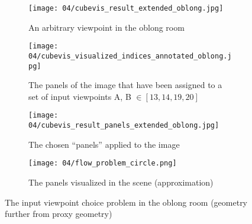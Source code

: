 \begin{figure}
\centering
    \hfill
    \begin{subfigure}[c]{0.45\textwidth}
            \centering
            \texttt{[image: 04/cubevis\_result\_extended\_oblong.jpg]}
            \caption{An arbitrary viewpoint in the oblong room}
    \end{subfigure}
    \hfill
    \begin{subfigure}[c]{0.45\textwidth}
            \centering
            \texttt{[image: 04/cubevis\_visualized\_indices\_annotated\_oblong.jpg]}
            \caption{The panels of the image that have been assigned to a set of input viewpoints A, B $\in [13, 14, 19, 20]$}
    \end{subfigure}
    \hfill

    \hfill
    \begin{subfigure}[c]{0.45\textwidth}
            \centering
            \texttt{[image: 04/cubevis\_result\_panels\_extended\_oblong.jpg]}
            \caption{The chosen ``panels'' applied to the image}
    \end{subfigure}
    \hfill
    \begin{subfigure}[c]{0.45\textwidth}
            \centering
            \texttt{[image: 04/flow\_problem\_circle.png]}
            \caption{The panels visualized in the scene (approximation)}
    \end{subfigure}
    \hfill
  \caption{The input viewpoint choice problem in the oblong room (geometry further from proxy geometry)} \label{fig:flow_problem_oblong}
\end{figure}


